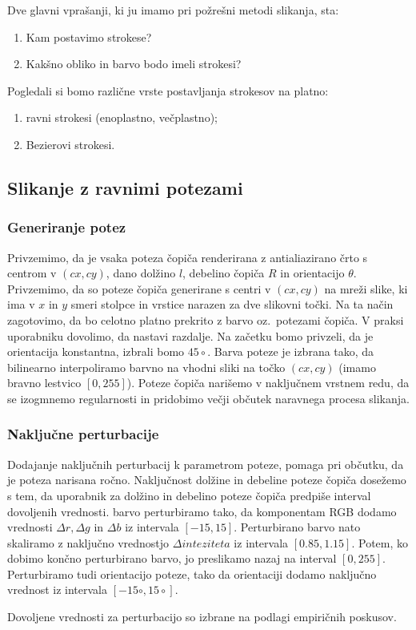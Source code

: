 Dve glavni vprašanji, ki ju imamo pri požrešni metodi slikanja, sta:
%
\begin{enumerate}
\item Kam postavimo strokese?
\item Kakšno obliko in barvo bodo imeli strokesi?
\end{enumerate}
%
Pogledali si bomo različne vrste postavljanja strokesov na platno:
%
\begin{enumerate}
\item ravni strokesi (enoplastno, večplastno);
\item Bezierovi strokesi.
\end{enumerate}
%
\subsection{Slikanje z ravnimi potezami}
\subsubsection{Generiranje potez}
Privzemimo, da je vsaka poteza čopiča renderirana z antialiazirano črto s centrom v $(cx, cy)$, dano dolžino $l$, debelino čopiča $R$ in orientacijo $\theta$. Privzemimo, da so poteze čopiča generirane s centri v $(cx, cy)$ na mreži slike, ki ima v $x$ in $y$ smeri stolpce in vrstice narazen za dve slikovni točki. Na ta način zagotovimo, da bo celotno platno prekrito z barvo oz.\ potezami čopiča. V praksi uporabniku dovolimo, da nastavi razdalje. Na začetku bomo privzeli, da je orientacija konstantna, izbrali bomo $45 \circ$. Barva poteze je izbrana tako, da bilinearno interpoliramo barvno na vhodni sliki na točko $(cx, cy)$ (imamo bravno lestvico $[0, 255]$). Poteze čopiča narišemo v naključnem vrstnem redu, da se izogmnemo regularnosti in pridobimo večji občutek naravnega procesa slikanja.
%
\subsubsection{Naključne perturbacije}
Dodajanje naključnih perturbacij k parametrom poteze, pomaga pri občutku, da je poteza narisana ročno. Naključnost dolžine in debeline poteze čopiča dosežemo s tem, da uporabnik za dolžino in debelino poteze čopiča predpiše interval dovoljenih vrednosti. barvo perturbiramo tako, da komponentam RGB dodamo vrednosti $\Delta r, \Delta g$ in $\Delta b$ iz intervala $[-15, 15]$. Perturbirano barvo nato skaliramo z naključno vrednostjo $\Delta inteziteta$ iz intervala $[0.85, 1.15]$. Potem, ko dobimo končno perturbirano barvo, jo preslikamo nazaj na interval $[0, 255]$. Perturbiramo tudi orientacijo poteze, tako da orientaciji dodamo naključno vrednost iz intervala $[-15 \circ, 15 \circ]$.
%
\begin{opomba}
Dovoljene vrednosti za perturbacijo so izbrane na podlagi empiričnih poskusov.
\end{opomba}
%
